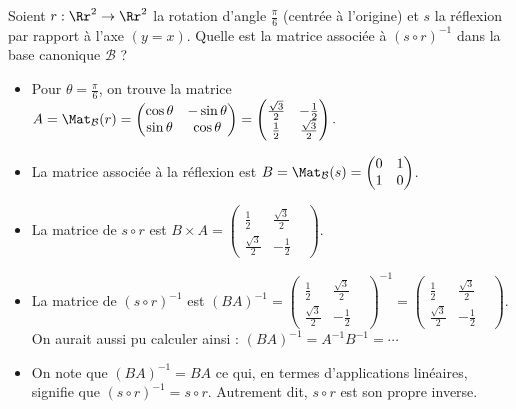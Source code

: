 \documentclass[class=report,crop=false]{standalone}
\begin{document}
\begin{exemple}
Soient $r : \Rr^2 \to \Rr^2$ la rotation d'angle $\frac\pi6$ (centrée à l'origine)
et $s$ la réflexion par rapport à l'axe $(y=x)$. Quelle est la matrice associée
à $(s \circ r)^{-1}$ dans la base canonique $\mathcal{B}$ ?

\begin{itemize}
  \item Pour $\theta = \frac\pi6$, on trouve la matrice $A = \Mat_{\mathcal{B}} (r) =
  \begin{pmatrix}
\cos\theta & -\sin\theta\\
\sin\theta & \cos\theta
\end{pmatrix}
=
\begin{pmatrix}
\frac{\sqrt{3}}{2} & -\frac12\\
\frac12& \frac{\sqrt{3}}{2}
\end{pmatrix}.$

  \item La matrice associée à la réflexion est $B = \Mat_{\mathcal{B}} (s) = \begin{pmatrix} 0&1\\1&0 \end{pmatrix}$.

  \item La matrice de $s \circ r$ est $B \times A = \begin{pmatrix}
\frac12&\frac{\sqrt{3}}{2} & \\
\frac{\sqrt{3}}{2}&-\frac12&
\end{pmatrix}$.

  \item La matrice de $(s \circ r)^{-1}$ est
  $(BA)^{-1} =  \begin{pmatrix}
\frac12&\frac{\sqrt{3}}{2} & \\
\frac{\sqrt{3}}{2}&-\frac12&
\end{pmatrix}^{-1}
= \begin{pmatrix}
\frac12&\frac{\sqrt{3}}{2} & \\
\frac{\sqrt{3}}{2}&-\frac12&
\end{pmatrix}$. On aurait aussi pu calculer
ainsi : $(BA)^{-1}= A^{-1}B^{-1} = \cdots$

  \item On note que $(BA)^{-1} = BA$ ce qui, en termes d'applications linéaires, signifie
  que $(s \circ r)^{-1} = s\circ r$. Autrement dit, $s\circ r$ est son propre inverse.
\end{itemize}
\end{exemple}
\end{document}
